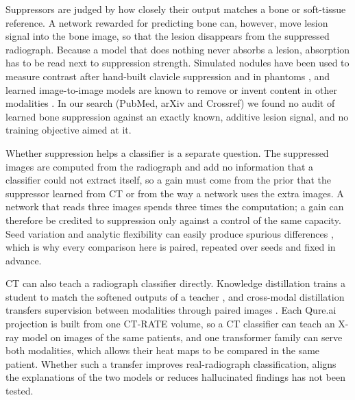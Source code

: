 Suppressors are judged by how closely their output matches a bone or soft-tissue reference. A network rewarded for predicting bone can,
however, move lesion signal into the bone image, so that the lesion disappears from the suppressed radiograph. Because a model that does
nothing never absorbs a lesion, absorption has to be read next to suppression strength. Simulated nodules have been used to measure
contrast after hand-built clavicle suppression and in phantoms \cite{hogeweg2013suppression,takagi2020dose}, and learned image-to-image
models are known to remove or invent content in other modalities
\cite{cohen2018distribution,antun2020instabilities,bhadra2021hallucinations,tivnan2024hallucination}. In our search (PubMed, arXiv and
Crossref) we found no audit of learned bone suppression against an exactly known, additive lesion signal, and no training objective aimed
at it.

Whether suppression helps a classifier is a separate question. The suppressed images are computed from the radiograph and add no
information that a classifier could not extract itself, so a gain must come from the prior that the suppressor learned from CT or from
the way a network uses the extra images. A network that reads three images spends three times the computation; a gain can therefore be
credited to suppression only against a control of the same capacity. Seed variation and analytic flexibility can easily produce spurious
differences \cite{varoquaux2022failures,simmons2011falsepositive}, which is why every comparison here is paired, repeated over seeds and
fixed in advance.

CT can also teach a radiograph classifier directly. Knowledge distillation trains a student to match the softened outputs of a teacher
\cite{hinton2015distilling}, and cross-modal distillation transfers supervision between modalities through paired images
\cite{gupta2016crossmodal}. Each Qure.ai projection is built from one CT-RATE volume, so a CT classifier can teach an X-ray model on
images of the same patients, and one transformer family \cite{liu2022swinv2} can serve both modalities, which allows their heat maps to be
compared in the same patient. Whether such a transfer improves real-radiograph classification, aligns the explanations of the two models
or reduces hallucinated findings has not been tested.


